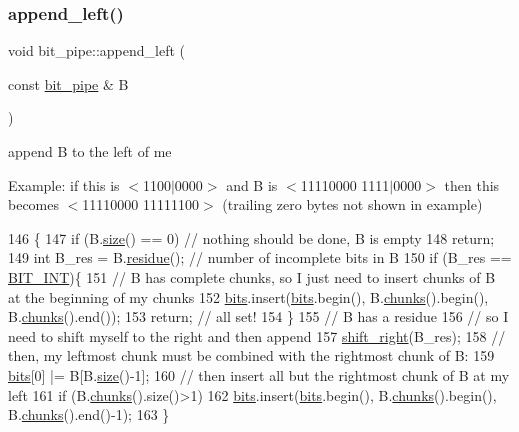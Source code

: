 \subsubsection{\texorpdfstring{append\+\_\+left()}{append\_left()}}
{\footnotesize\ttfamily void bit\+\_\+pipe\+::append\+\_\+left (\begin{DoxyParamCaption}\item[{const \hyperlink{classbit__pipe}{bit\+\_\+pipe} \&}]{B }\end{DoxyParamCaption})}



append B to the left of me 

Example\+: if this is $<$1100$\vert$0000$>$ and B is $<$11110000 1111$\vert$0000$>$ then this becomes $<$11110000 11111100$>$ (trailing zero bytes not shown in example) 
\begin{DoxyCode}
146                                            \{
147   \textcolor{keywordflow}{if} (B.\hyperlink{classbit__pipe_a4bdc57f1f598bfad0eaa40860f17000c}{size}() == 0) \textcolor{comment}{// nothing should be done, B is empty}
148     \textcolor{keywordflow}{return};
149   \textcolor{keywordtype}{int} B\_res = B.\hyperlink{classbit__pipe_a283f47fa4422ac50b9b28e8f276f7252}{residue}(); \textcolor{comment}{// number of incomplete bits in B}
150   \textcolor{keywordflow}{if} (B\_res == \hyperlink{bitstream_8h_afcadf5aa65c5159bfb96c4d82ebc0a5d}{BIT\_INT})\{
151     \textcolor{comment}{// B has complete chunks, so I just need to insert chunks of B at the beginning of my chunks}
152     \hyperlink{classbit__pipe_a86f38af1e9736b053728033490476b50}{bits}.insert(\hyperlink{classbit__pipe_a86f38af1e9736b053728033490476b50}{bits}.begin(), B.\hyperlink{classbit__pipe_aebf19a4d9425e5ca10fc4fd3d78cada2}{chunks}().begin(), B.\hyperlink{classbit__pipe_aebf19a4d9425e5ca10fc4fd3d78cada2}{chunks}().end());
153     \textcolor{keywordflow}{return}; \textcolor{comment}{// all set!}
154   \}
155   \textcolor{comment}{// B has a residue}
156   \textcolor{comment}{// so I need to shift myself to the right and then append}
157   \hyperlink{classbit__pipe_a341a1f62d728a67f730503ca722a7770}{shift\_right}(B\_res);
158   \textcolor{comment}{// then, my leftmost chunk must be combined with the rightmost chunk of B:}
159   \hyperlink{classbit__pipe_a86f38af1e9736b053728033490476b50}{bits}[0] |= B[B.\hyperlink{classbit__pipe_a4bdc57f1f598bfad0eaa40860f17000c}{size}()-1];
160   \textcolor{comment}{// then insert all but the rightmost chunk of B at my left}
161   \textcolor{keywordflow}{if} (B.\hyperlink{classbit__pipe_aebf19a4d9425e5ca10fc4fd3d78cada2}{chunks}().size()>1)
162     \hyperlink{classbit__pipe_a86f38af1e9736b053728033490476b50}{bits}.insert(\hyperlink{classbit__pipe_a86f38af1e9736b053728033490476b50}{bits}.begin(), B.\hyperlink{classbit__pipe_aebf19a4d9425e5ca10fc4fd3d78cada2}{chunks}().begin(), B.\hyperlink{classbit__pipe_aebf19a4d9425e5ca10fc4fd3d78cada2}{chunks}().end()-1);
163 \}
\end{DoxyCode}
\mbox{\label{classbit__pipe_aebf19a4d9425e5ca10fc4fd3d78cada2}} 

